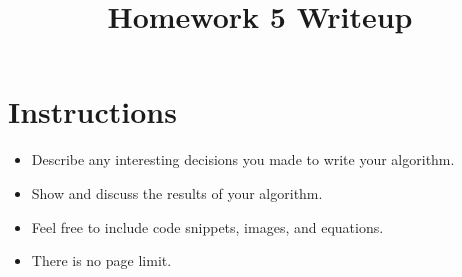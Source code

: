 \title{\vspace{-1cm}Homework 5 Writeup}



\maketitle
\vspace{-3cm}
\thispagestyle{fancy}

\section*{Instructions}
\begin{itemize}
  \item Describe any interesting decisions you made to write your algorithm.
  \item Show and discuss the results of your algorithm.
  \item Feel free to include code snippets, images, and equations.
  \item There is no page limit.

\end{itemize}

